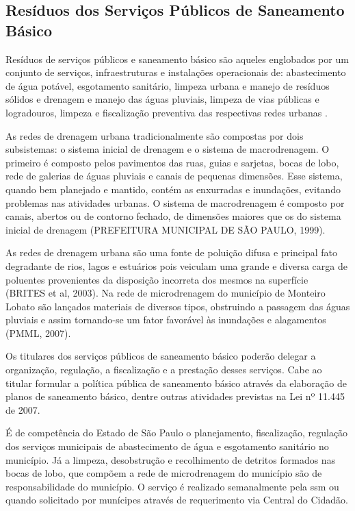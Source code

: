 %	
	
	\subsection{Resíduos dos Serviços Públicos de Saneamento Básico}
	
	Resíduos de serviços públicos e saneamento básico são aqueles englobados por um conjunto de serviços, infraestruturas e instalações operacionais de: abastecimento de água potável, esgotamento sanitário, limpeza urbana e manejo de resíduos sólidos e drenagem e manejo das águas pluviais, limpeza de vias públicas e logradouros, limpeza e fiscalização preventiva das respectivas redes urbanas \cite{brasil:12305}.  
	
	As redes de drenagem urbana tradicionalmente são compostas por dois subsistemas: o sistema inicial de drenagem e o sistema de macrodrenagem. O primeiro é composto pelos pavimentos das ruas, guias e sarjetas, bocas de lobo, rede de galerias de águas pluviais e canais de pequenas dimensões. Esse sistema, quando bem planejado e mantido, contém as enxurradas e inundações, evitando problemas nas atividades urbanas. O sistema de macrodrenagem é composto por canais, abertos ou de contorno fechado, de dimensões maiores que os do sistema inicial de drenagem (PREFEITURA MUNICIPAL DE SÃO PAULO, 1999).
	
	As redes de drenagem urbana são uma fonte de poluição difusa e principal fato degradante de rios, lagos e estuários pois veiculam uma grande e diversa carga de poluentes provenientes da disposição incorreta dos mesmos na superfície (BRITES et al, 2003). Na rede de microdrenagem do município de Monteiro Lobato são lançados materiais de diversos tipos, obstruindo a passagem das águas pluviais e assim tornando-se um fator favorável às inundações e alagamentos (PMML, 2007).
	
	Os titulares dos serviços públicos de saneamento básico poderão delegar a organização, regulação, a fiscalização e a prestação desses serviços. Cabe ao titular formular a política pública de saneamento básico através da elaboração de planos de saneamento básico, dentre outras atividades previstas na Lei nº 11.445 de 2007.
	
	É de competência do Estado de São Paulo o planejamento, fiscalização, regulação dos serviços municipais de abastecimento de água e esgotamento sanitário no município. Já a limpeza, desobstrução e recolhimento de detritos formados nas bocas de lobo, que compõem a rede de microdrenagem do município são de responsabilidade do município. O serviço é realizado semanalmente pela \gls{ssm} ou quando solicitado por munícipes através de requerimento via Central do Cidadão.
	
